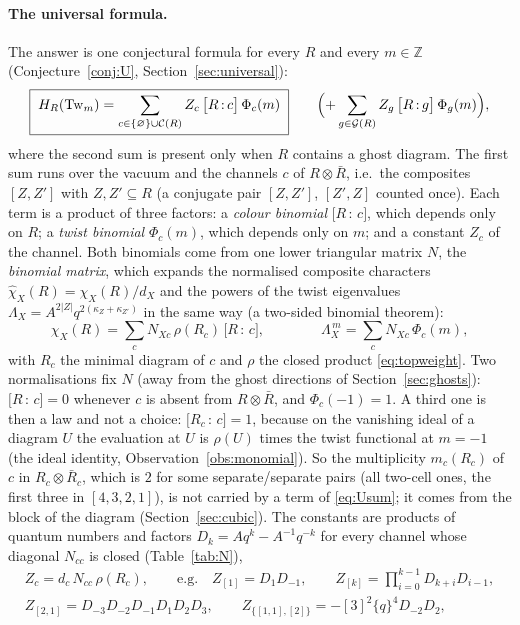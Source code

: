 \documentclass[11pt]{article}
\newcommand{\Tw}{\mathrm{Tw}}
\newcommand{\Lam}{\Lambda}
\newcommand{\vac}{\varnothing}
\newcommand{\Chan}{\mathcal C}
\newcommand{\Rbar}{\bar R}
\newcommand{\chih}{\hat\chi}
\newcommand{\cf}[2]{\bigl[#1\,{:}\,#2\bigr]}
\newcommand{\Gh}{\mathcal G}
\begin{document}
\paragraph{The universal formula.}  The answer is one conjectural formula for every $R$ and every $m\in\mathbb Z$
(Conjecture~\ref{conj:U}, Section~\ref{sec:universal}):
\begin{equation}\label{eq:Usum}
\boxed{\;H_R(\Tw_m)=\sum_{c\in\{\vac\}\cup\Chan(R)}Z_c\,\cf Rc\,\Phi_c(m)\;}
\qquad\Bigl(+\sum_{g\in\Gh(R)}Z_g\,\cf Rg\,\Phi_g(m)\Bigr),
\end{equation}
where the second sum is present only when $R$ contains a ghost diagram.
The first sum runs over the vacuum and the channels $c$ of $R\otimes\Rbar$, i.e.\ the composites $[Z,Z']$ with $Z,Z'\subseteq R$
(a conjugate pair $[Z,Z']$, $[Z',Z]$ counted once).  Each term is a product of three factors: a \emph{colour binomial}
$\cf Rc$, which depends only on $R$; a \emph{twist binomial} $\Phi_c(m)$, which depends only on $m$; and a constant $Z_c$ of
the channel.  Both binomials come from one lower triangular matrix $N$, the \emph{binomial matrix}, which expands the
normalised composite characters $\chih_X(R)=\chi_X(R)/d_X$ and the powers of the twist eigenvalues
$\Lam_X=A^{2|Z|}q^{2(\kappa_Z+\kappa_{Z'})}$ in the same way (a two-sided binomial theorem):
\begin{equation}\label{eq:twobinomS}
\chih_X(R)=\sum_cN_{Xc}\,\rho(R_c)\,\cf Rc,\qquad\qquad \Lam_X^{\,m}=\sum_cN_{Xc}\,\Phi_c(m),
\end{equation}
with $R_c$ the minimal diagram of $c$ and $\rho$ the closed product \eqref{eq:topweight}.  Two normalisations fix $N$
(away from the ghost directions of Section~\ref{sec:ghosts}): $\cf Rc=0$ whenever $c$ is absent from $R\otimes\Rbar$, and
$\Phi_c(-1)=1$.  A third one is then a law and not a choice: $\cf{R_c}c=1$, because on the vanishing ideal of a diagram
$U$ the evaluation at $U$ is $\rho(U)$ times the twist functional at $m=-1$ (the ideal identity,
Observation~\ref{obs:monomial}).  So the multiplicity $m_c(R_c)$ of $c$ in $R_c\otimes\Rbar_c$, which is $2$ for some
separate/separate pairs (all two-cell ones, the first three in $[4,3,2,1]$), is not carried by a term of
\eqref{eq:Usum}; it comes from the block of the diagram (Section~\ref{sec:cubic}).  The constants are products
of quantum numbers and factors $D_k=Aq^k-A^{-1}q^{-k}$ for every channel whose diagonal $N_{cc}$ is closed (Table~\ref{tab:N}),
\begin{gather*}
Z_c=d_c\,N_{cc}\,\rho(R_c),\qquad\text{e.g.}\quad Z_{[1]}=D_1D_{-1},\qquad Z_{[k]}=\prod_{i=0}^{k-1}D_{k+i}D_{i-1},\\
Z_{[2,1]}=D_{-3}D_{-2}D_{-1}D_1D_2D_3,\qquad Z_{\{[1,1],[2]\}}=-[3]^2\{q\}^4D_{-2}D_2,
\end{gather*}
\end{document}

